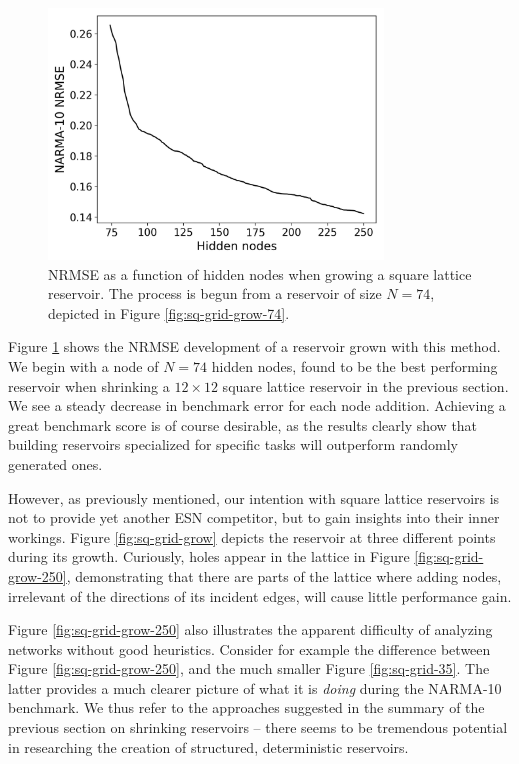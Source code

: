\begin{figure}[htb]
  \centering
  \includegraphics[width=3.5in]{figures/grow-performance.png}
  \caption{
    NRMSE as a function of hidden nodes when growing a square lattice
reservoir. The process is begun from a reservoir of size $N = 74$, depicted in
Figure \protect\ref{fig:sq-grid-grow-74}.
  }
  \label{fig:sq-grow-performance}
\end{figure}

Figure \ref{fig:sq-grow-performance} shows the NRMSE development of a reservoir
grown with this method. We begin with a node of $N = 74$ hidden nodes, found to
be the best performing reservoir when shrinking a $12 \times 12$ square lattice
reservoir in the previous section. We see a steady decrease in benchmark error
for each node addition. Achieving a great benchmark score is of course
desirable, as the results clearly show that building reservoirs specialized for
specific tasks will outperform randomly generated ones.

However, as previously mentioned, our intention with square lattice reservoirs
is not to provide yet another ESN competitor, but to gain insights into their
inner workings. Figure \ref{fig:sq-grid-grow} depicts the reservoir at three
different points during its growth. Curiously, holes appear in the lattice in
Figure \ref{fig:sq-grid-grow-250}, demonstrating that there are parts of the
lattice where adding nodes, irrelevant of the directions of its incident edges,
will cause little performance gain.

Figure \ref{fig:sq-grid-grow-250} also illustrates the apparent difficulty of
analyzing networks without good heuristics. Consider for example the difference
between Figure \ref{fig:sq-grid-grow-250}, and the much smaller Figure
\ref{fig:sq-grid-35}. The latter provides a much clearer picture of what it is
\textit{doing} during the NARMA-10 benchmark. We thus refer to the approaches
suggested in the summary of the previous section on shrinking reservoirs --
there seems to be tremendous potential in researching the creation of
structured, deterministic reservoirs.

